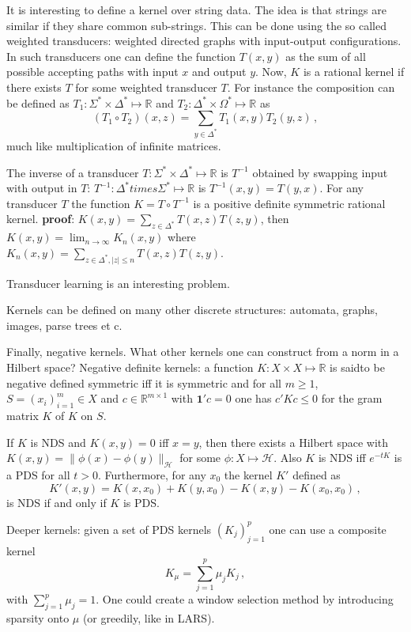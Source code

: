 \documentclass[a4paper]{article}
\newcommand{\Real}{\mathbb{R}}
\newcommand{\one}{\mathbf{1}}
\newcommand{\Hcal}{\mathcal{H}}
\begin{document}
It is interesting to define a kernel over string data. The idea is that strings
are similar if they share common sub-strings. This can be done using the so called
weighted transducers: weighted directed graphs with input-output configurations.
In such transducers one can define the function $T(x,y)$ as the sum of all possible
accepting paths with input $x$ and output $y$.
Now, $K$ is a rational kernel if there exists $T$ for some weighted transducer $T$.
For instance the composition can be defined as $T_1:\Sigma^*\times \Delta^* \mapsto \Real$
and $T_2:\Delta^*\times\Omega^* \mapsto \Real$ as
\[ (T_1\circ T_2)(x, z) = \sum_{y\in \Delta^*} T_1(x, y) T_2(y, z) \,, \]
much like multiplication of infinite matrices.

The inverse of a transducer $T:\Sigma^*\times \Delta^* \mapsto \Real$ is $T^{-1}$
obtained by swapping input with output in $T$: $T^{-1}:\Delta^* times \Sigma^*\mapsto \Real$
is $T^{-1}(x, y) = T(y, x)$.
For any transducer $T$ the function $K = T\circ T^{-1}$ is a positive definite symmetric
rational kernel.
\textbf{proof}: $K(x, y) = \sum_{z\in \Delta^*} T(x, z) T(z, y)$, then
$K(x, y) = \lim_{n\to \infty} K_n(x, y)$ where
$K_n(x, y) = \sum_{z\in\Delta^*, |z| \leq n} T(x, z) T(z, y)$.

Transducer learning is an interesting problem.

Kernels can be defined on many other discrete structures: automata, graphs, images,
parse trees et c.

Finally, negative kernels. What other kernels one can construct from a norm in a
Hilbert space? Negative definite kernels: a function $K:X\times X\mapsto\Real$
is saidto be negative defined symmetric iff it is symmetric and for all $m\geq 1$, 
$S=(x_i)_{i=1}^m\in X$ and $c\in\Real^{m\times 1}$ with $\one'c = 0$ one has
$c'Kc \leq 0$ for the gram matrix $K$ of $K$ on $S$.

If $K$ is NDS and $K(x, y) = 0$ iff $x=y$, then there exists a Hilbert space with
$K(x, y) = \|\phi(x) - \phi(y)\|_\Hcal$ for some $\phi:X\mapsto\Hcal$. Also $K$ is
NDS iff $e^{-tK}$ is a PDS for all $t>0$. Furthermore, for any $x_0$ the kernel $K'$
defined as 
\[K'(x, y) = K(x, x_0) + K(y, x_0) - K(x, y) - K(x_0, x_0) \,,\]
is NDS if and only if $K$ is PDS.

Deeper kernels: given a set of PDS kernels $(K_j)_{j=1}^p$ one can use a composite
kernel
\[K_\mu = \sum_{j=1}^p \mu_j K_j \,,\]
with $\sum_{j=1}^p \mu_j = 1$. One could create a window selection method by introducing
sparsity onto $\mu$ (or greedily, like in LARS).
\end{document}
